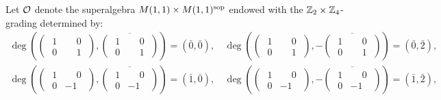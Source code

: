 \begin{ex}\label{ex:superalgebra-O}
	Let $\mathcal O$ denote the superalgebra $M(1,1) \times M(1,1)^{\mathrm{sop}}$ endowed with the $\mathbb{Z}_2\times \mathbb{Z}_4$-grading determined by:
	\begin{align*}
		\deg \left(\begin{pmatrix}
			\phantom{.}1 & \phantom{-}0\phantom{.} \\
			\phantom{.}0 & \phantom{-}1\phantom{.}
		\end{pmatrix}, \overline{\begin{pmatrix}
				\phantom{.}1 & \phantom{-}0\phantom{.} \\
				\phantom{.}0 & \phantom{-}1\phantom{.}
			\end{pmatrix}}\right) = (\bar 0, \bar 0),\, &
		\deg \left(\begin{pmatrix}
			\phantom{.}1 & \phantom{-}0\phantom{.} \\
			\phantom{.}0 & \phantom{-}1\phantom{.}
		\end{pmatrix}, -\overline{\begin{pmatrix}
				\phantom{.}1 & \phantom{-}0\phantom{.} \\
				\phantom{.}0 & \phantom{-}1\phantom{.}
			\end{pmatrix}}\right) = (\bar 0, \bar 2),    \\
		\deg \left(\begin{pmatrix}
			\phantom{.}1 & \phantom{-}0\phantom{.} \\
			\phantom{.}0 & -1\phantom{.}
		\end{pmatrix}, \overline{\begin{pmatrix}
				\phantom{.}1 & \phantom{-}0\phantom{.} \\
				\phantom{.}0 & -1\phantom{.}
			\end{pmatrix}}\right) = (\bar 1, \bar 0),\, &
		\deg \left(\begin{pmatrix}
			\phantom{.}1 & \phantom{-}0\phantom{.} \\
			\phantom{.}0 & -1\phantom{.}
		\end{pmatrix}, -\overline{\begin{pmatrix}
				\phantom{.}1 & \phantom{-}0\phantom{.} \\
				\phantom{.}0 & -1\phantom{.}
			\end{pmatrix}}\right) = (\bar 1, \bar 2),    \\

\end{align*}
\end{ex}

